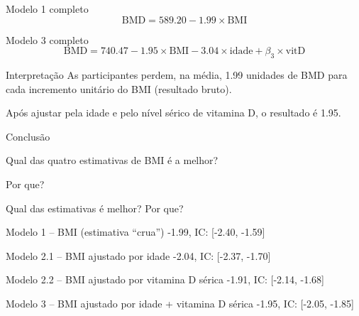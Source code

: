 \documentclass{beamer}
\begin{document}
\begin{frame}{\scriptsize }
  \begin{exampleblock}{Modelo 1 completo}
    \tiny
    \begin{displaymath}
      \text{BMD} =589.20 -1.99 \times\text{BMI}
    \end{displaymath}
  \end{exampleblock}
  \begin{exampleblock}{Modelo 3 completo}
    \footnotesize
    \begin{displaymath}
      \text{BMD} =740.47 -1.95 \times\text{BMI} -3.04 \times\text{idade} + \beta_3 \times\text{vitD}
    \end{displaymath}
  \end{exampleblock}
  \begin{exampleblock}{Interpretação}
    \footnotesize
    As participantes perdem, na média, 1.99 unidades de BMD para cada incremento unitário do BMI (resultado bruto).

    \bigskip
    Após ajustar pela idade e pelo nível sérico de vitamina D, o resultado é 1.95.
  \end{exampleblock}
\end{frame}

\begin{frame}{\scriptsize Conclusão}
  \begin{center}
    Qual das quatro estimativas de BMI é a melhor?

    \bigskip
    Por que?
  \end{center}
\end{frame}

\begin{frame}{\scriptsize Qual das estimativas é melhor? Por que?}
  \begin{exampleblock}{\scriptsize Modelo 1 -- BMI (estimativa ``crua'')}
    -1.99, IC: [-2.40, -1.59]
  \end{exampleblock}
  \begin{exampleblock}{\scriptsize Modelo 2.1 -- BMI ajustado por idade}
    -2.04, IC: [-2.37, -1.70]
  \end{exampleblock}
  \begin{exampleblock}{\scriptsize Modelo 2.2 -- BMI ajustado por vitamina D sérica}
    -1.91, IC: [-2.14, -1.68]
  \end{exampleblock}
  \begin{exampleblock}{\scriptsize Modelo 3 -- BMI ajustado por idade + vitamina D sérica}
    -1.95, IC: [-2.05, -1.85]
  \end{exampleblock}
\end{frame}
\end{document}
